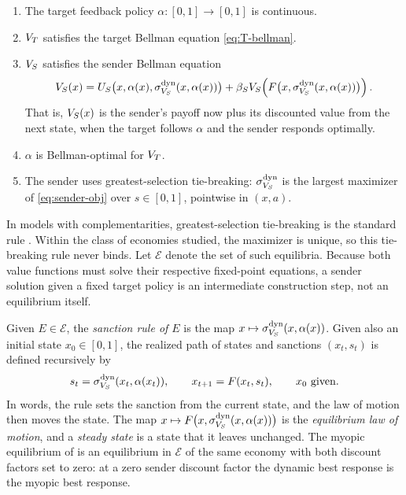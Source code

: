 \begin{enumerate}[label=(E\arabic*)]
\item[(E0)] The target feedback policy $\alpha\colon[0,1]\to[0,1]$ is continuous.
\item[(E1)] $V_T$ satisfies the target Bellman equation \eqref{eq:T-bellman}.
\item[(E2)] $V_S$ satisfies the sender Bellman equation
\[
V_S(x)=
U_S\bigl(x,\alpha(x),\sigma^{\mathrm{dyn}}_{V_S}(x,\alpha(x))\bigr)
+\beta_SV_S\!\left(
F\bigl(x,\sigma^{\mathrm{dyn}}_{V_S}(x,\alpha(x))\bigr)
\right).
\]
That is, $V_S(x)$ is the sender's payoff now plus its discounted value from the next
state, when the target follows $\alpha$ and the sender responds optimally.
\item[(E3)] $\alpha$ is Bellman-optimal for $V_T$.
\item[(E4)] The sender uses greatest-selection tie-breaking: $\sigma^{\mathrm{dyn}}_{V_S}$ is the
largest maximizer of \eqref{eq:sender-obj} over $s\in[0,1]$, pointwise in $(x,a)$.
\end{enumerate}
In models with complementarities, greatest-selection tie-breaking is the standard
rule \citep[Thm.~2.8.3]{topkis1998}. Within the class of economies studied, the maximizer
is unique, so this tie-breaking rule never binds. Let $\mathcal E$ denote the set of
such equilibria. Because both value functions must solve their respective fixed-point
equations, a sender solution given a fixed target policy is an intermediate
construction step, not an equilibrium itself.

 Given $E\in\mathcal E$, the
\emph{sanction rule of $E$} is the map $x\mapsto\sigma^{\mathrm{dyn}}_{V_S}(x,\alpha(x))$.
Given also an initial state $x_0\in[0,1]$, the realized path of states and
sanctions $(x_t,s_t)$ is defined recursively by
\begin{equation}
s_t=\sigma^{\mathrm{dyn}}_{V_S}(x_t,\alpha(x_t)),
\qquad
x_{t+1}=F(x_t,s_t),
\qquad
x_0\ \text{given}.
\end{equation}
In words, the rule sets the sanction from the current state, and the law of motion then
moves the state. The map $x\mapsto F\bigl(x,\sigma^{\mathrm{dyn}}_{V_S}(x,\alpha(x))\bigr)$ is the
\emph{equilibrium law of motion}, and a \emph{steady state} is a state that it
leaves unchanged. The myopic equilibrium of  is an equilibrium in
$\mathcal E$ of the same economy with both discount factors set to zero: at a zero
sender discount factor the dynamic best response is the myopic best response.

